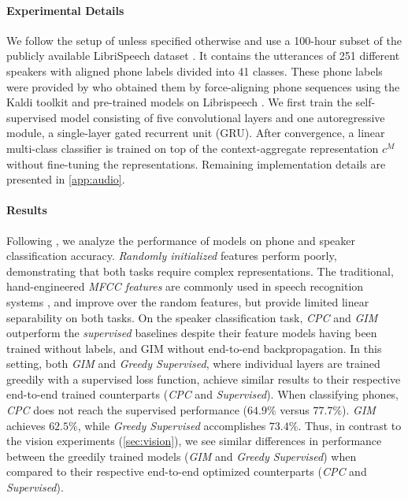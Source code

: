 \documentclass{article}
\begin{document}
\paragraph{Experimental Details}
We follow the setup of \citet{oord2018representation} unless specified otherwise and use a 100-hour subset of the publicly available LibriSpeech dataset \citep{panayotov2015librispeech}. It contains the utterances of 251 different speakers with aligned phone labels divided into 41 classes. These phone labels were provided by \citet{oord2018representation} who obtained them by force-aligning phone sequences using the Kaldi toolkit \citep{povey2011kaldi} and pre-trained models on Librispeech \citep{kaldi_model}.
We first train the self-supervised model consisting of five convolutional layers and one autoregressive module, a single-layer gated recurrent unit (GRU). After convergence, a linear multi-class classifier is trained on top of the context-aggregate representation $c^M$ without fine-tuning the representations. Remaining implementation details are presented in \cref{app:audio}. 

\paragraph{Results} 
Following , we analyze the performance of models on phone and speaker classification accuracy. \textit{Randomly initialized} features perform poorly, demonstrating that both tasks require complex representations. The traditional, hand-engineered \textit{MFCC features} are commonly used in speech recognition systems \citep{ganchev2005comparative}, and improve over the random features, but provide limited linear separability on both tasks. On the speaker classification task, \textit{CPC} and \textit{GIM} outperform the \textit{supervised} baselines despite their feature models having been trained without labels, and GIM without end-to-end backpropagation. In this setting, both \textit{GIM} and \textit{Greedy Supervised}, where individual layers are trained greedily with a supervised loss function, achieve similar results to their respective end-to-end trained counterparts (\textit{CPC} and \textit{Supervised}). When classifying phones, \textit{CPC} does not reach the supervised performance ($64.9\%$ versus $77.7\%$). \textit{GIM} achieves $62.5\%$, while \textit{Greedy Supervised} accomplishes $73.4\%$. Thus, in contrast to the vision experiments (\cref{sec:vision}), we see similar differences in performance between the greedily trained models (\textit{GIM} and \textit{Greedy Supervised}) when compared to their respective end-to-end optimized counterparts (\textit{CPC} and \textit{Supervised}). 
\end{document}
